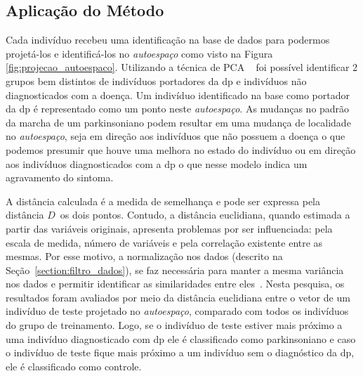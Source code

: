 \subsection{Aplicação do Método}
Cada indivíduo recebeu uma identificação na base de dados para podermos projetá-los e identificá-los no \textit{autoespaço} como visto na Figura \ref{fig:projecao_autoespaco}. Utilizando a técnica de PCA ~\cite{Shlens05atutorial} foi possível identificar 2 grupos bem distintos de indivíduos portadores da \ac{dp} e indivíduos não diagnosticados com a doença. Um indivíduo identificado na base como portador da \ac{dp} é representado como um ponto neste \textit{autoespaço}. As mudanças no padrão da marcha de um parkinsoniano podem resultar em uma mudança de localidade no \textit{autoespaço}, seja em direção aos indivíduos que não possuem a doença o que podemos presumir que houve uma melhora no estado do indivíduo ou em direção aos indivíduos diagnosticados com a \ac{dp} o que nesse modelo indica um agravamento do sintoma.

A distância calculada é a medida de semelhança e pode ser expressa pela distância $ D $\ os dois pontos. Contudo, a distância euclidiana, quando estimada a partir das variáveis originais, apresenta problemas por ser influenciada: pela escala de medida, número de variáveis e pela correlação existente entre as mesmas. Por esse motivo, a normalização nos dados (descrito na Seção~\ref{section:filtro_dados}), se faz necessária para manter a mesma variância nos dados e permitir identificar as similaridades entre eles~\cite{vicini2005}. Nesta pesquisa, os resultados foram avaliados por meio da distância euclidiana entre o vetor de um indivíduo de teste projetado no \textit{autoespaço}, comparado com todos os indivíduos do grupo de treinamento. Logo, se o indivíduo de teste estiver mais próximo a uma indivíduo diagnosticado com \ac{dp} ele é classificado como parkinsoniano e caso o indivíduo de teste fique mais próximo a um indivíduo sem o diagnóstico da \ac{dp}, ele é classificado como controle.


